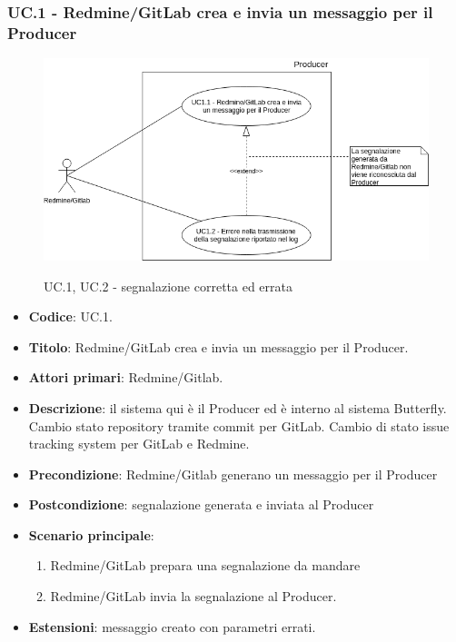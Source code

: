 \subsubsection{UC\theuccount.1 - Redmine/GitLab crea e invia un messaggio per il Producer}
    \begin{figure}[H]
		\centering
		\includegraphics[width=1\textwidth]{img/UC1_1.png}\\
		\caption{UC\theuccount.1, UC\theuccount.2 - segnalazione corretta ed errata}
	\end{figure}
	\begin{itemize}
		\item \textbf{Codice}: UC\theuccount.1.
		\item \textbf{Titolo}: Redmine/GitLab crea e invia un messaggio per il Producer.
		\item \textbf{Attori primari}: Redmine/Gitlab.
		\item \textbf{Descrizione}:
		il sistema qui è il Producer ed è interno al sistema Butterfly. Cambio stato repository tramite commit per GitLab. Cambio di stato issue tracking system per GitLab e Redmine.
		\item \textbf{Precondizione}: Redmine/Gitlab generano un messaggio per il Producer
		\item \textbf{Postcondizione}: segnalazione generata e inviata al Producer
		\item \textbf{Scenario principale}: 
		\begin{enumerate}
			\item Redmine/GitLab prepara una segnalazione da mandare
			\item Redmine/GitLab invia la segnalazione al Producer.
		\end{enumerate}
		\item \textbf{Estensioni}: messaggio creato con parametri errati.
	\end{itemize}


